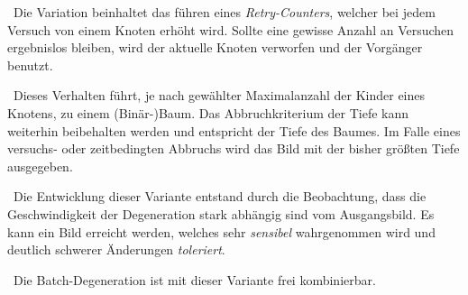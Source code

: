 ~\newline Die Variation beinhaltet das führen eines \textit{Retry-Counters}, welcher bei jedem Versuch von einem Knoten erhöht wird. Sollte eine gewisse Anzahl an Versuchen ergebnislos bleiben, wird der aktuelle Knoten verworfen und der Vorgänger benutzt. 

~\newline Dieses Verhalten führt, je nach gewählter Maximalanzahl der Kinder eines Knotens, zu einem (Binär-)Baum. Das Abbruchkriterium der Tiefe kann weiterhin beibehalten werden und entspricht der Tiefe des Baumes. Im Falle eines versuchs- oder zeitbedingten Abbruchs wird das Bild mit der bisher größten Tiefe ausgegeben.

~\newline Die Entwicklung dieser Variante entstand durch die Beobachtung, dass die Geschwindigkeit der Degeneration stark abhängig sind vom Ausgangsbild. Es kann ein Bild erreicht werden, welches sehr \textit{sensibel} wahrgenommen wird und deutlich schwerer Änderungen \textit{toleriert}.

~\newline Die Batch-Degeneration ist mit dieser Variante frei kombinierbar.  